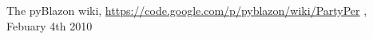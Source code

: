 \begin{thebibliography}{100}

  The pyBlazon wiki, 
  \url{https://code.google.com/p/pyblazon/wiki/PartyPer} , 
  Febuary 4th 2010

\end{thebibliography}